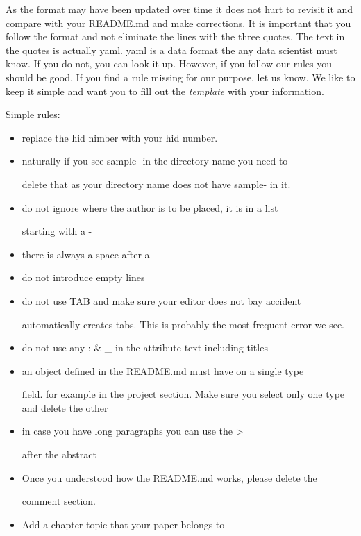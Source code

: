 
As the format may have been updated over time it does not hurt to
revisit it and compare with your README.md and make corrections. It is
important that you follow the format and not eliminate the lines with
the three quotes. The text in the quotes is actually yaml. yaml is a
data format the any data scientist must know. If you do not, you can
look it up. However, if you follow our rules you should be good. If you
find a rule missing for our purpose, let us know. We like to keep it
simple and want you to fill out the \emph{template} with your
information.

Simple rules:

\begin{itemize}

\item
  replace the hid nimber with your hid number.
\item naturally if you see sample- in the directory name you need to

  delete that as your directory name does not have sample- in it.
\item do not ignore where the author is to be placed, it is in a list

  starting with a -
\item there is always a space after a -

\item do not introduce empty lines

\item do not use TAB and make sure your editor does not bay accident

  automatically creates tabs. This is probably the most frequent error
  we see.
\item do not use any : \& \_ in the attribute text including titles

\item an object defined in the README.md must have on a single type

  field.  for example in the project section. Make sure you select
  only one type and delete the other
\item in case you have long paragraphs you can use the \textgreater{}

  after the abstract
\item Once you understood how the README.md works, please delete the

  comment section.
\item Add a chapter topic that your paper belongs to

\end{itemize}

